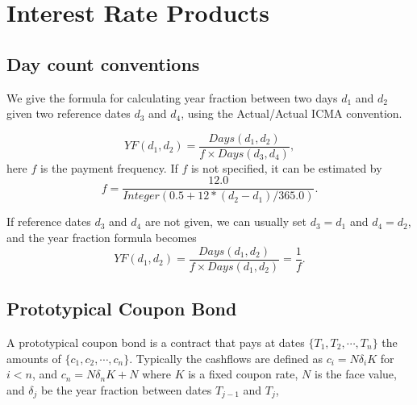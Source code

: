 \chapter{Interest Rate Products}

\section{Day count conventions}

We give the formula for calculating year fraction between two days $d_1$ and
$d_2$ given two reference dates $d_3$ and $d_4$, using the Actual/Actual ICMA
convention.

\begin{equation}
  YF(d_1,d_2) = \frac{Days(d_1,d_2)}{f \times Days(d_3, d_4)},
\end{equation}
here $f$ is the payment frequency. If $f$ is not specified, it can be estimated
by
\begin{equation}
  f = \frac{12.0}{Integer(0.5 + 12 * (d_2 - d_1) / 365.0)}.
\end{equation}

If reference dates $d_3$ and $d_4$ are not given, we can usually set $d_3=d_1$
and $d_4=d_2$, and the year fraction formula becomes
\begin{equation}
  YF(d_1,d_2) = \frac{Days(d_1,d_2)}{f \times Days(d_1, d_2)}
              = \frac{1}{f}.
\end{equation}





\section{Prototypical Coupon Bond}
A prototypical coupon bond is a contract that pays at dates 
$\{T_1,T_2,\cdots,T_{n}\}$ the amounts of $\{c_1,c_2,\cdots,c_n\}$. Typically
the cashflows are defined as $c_i=N\delta_i K$ for $i<n$, and 
$c_n=N\delta_n K+N$ where $K$ is a fixed coupon rate, $N$ is the face value,
and $\delta_j$ be the year fraction between dates $T_{j-1}$ and $T_{j}$,

